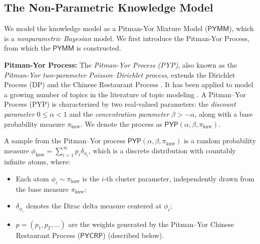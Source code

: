\documentclass[11pt]{article}
\theoremstyle{plain}
\theoremstyle{definition}
\newcommand{\Vocknow}{\mathbb{V}_{\text{knw}}}
\newcommand{\knwModel}{\phi_{\text{knw}}}
\newcommand{\PYP}{\mathsf{PYP}}
\newcommand{\PYMM}{\mathsf{PYMM}}
\newcommand{\PYCRP}{\mathsf{PYCRP}}
\newcommand{\basemeasure}{\pi_{\text{knw}}}
\newcommand{\jian}[1]{{\it \color{red}{Jian: #1}}}
\begin{document}



\subsection{The Non-Parametric Knowledge Model}
\label{sec:PYMM}

We model the knowledge model as a Pitman-Yor Mixture Model ($\PYMM$), which is a {\em nonparametric Bayesian} model. 
We first introduce the Pitman-Yor Process, from which the $\PYMM$ is constructed.


\noindent
{\bf Pitman-Yor Process:}
The {\em Pitman-Yor Process (PYP)}, also known as the {\em Pitman-Yor two-parameter Poisson–Dirichlet process}, extends the Dirichlet Process (DP) and the Chinese Restaurant Process \citep{pitman1997two}. It has been applied
to model a growing number of topics in the literature of 
topic modeling \citep{teh2006hierarchical, goldwater2011producing}. A Pitman–Yor Process (PYP) is characterized by two real-valued parameters: the \emph{discount parameter} \( 0 \leq \alpha < 1 \) and the \emph{concentration parameter} \( \beta > -\alpha \), along with a base probability measure \( \basemeasure \). We denote the process as \( \PYP(\alpha, \beta, \basemeasure) \).


A sample from the Pitman–Yor process \( \PYP(\alpha, \beta, \basemeasure) \) is a  
random probability measure \( \knwModel = \sum_{i=1}^{\infty} p_i \delta_{\phi_i} \),  
which is a discrete distribution with countably infinite atoms, where:
\begin{itemize}
    \item Each atom \( \phi_i \sim \basemeasure \) is the $i$-th cluster parameter,  independently drawn from the base measure \( \basemeasure \);
    \item \( \delta_{\phi_i} \) denotes the Dirac delta measure centered at \( \phi_i \);
    \item \( p = (p_1, p_2, \ldots) \) are the weights generated by the Pitman–Yor Chinese Restaurant Process ($\PYCRP$) (described below).
\end{itemize}
\end{document}
